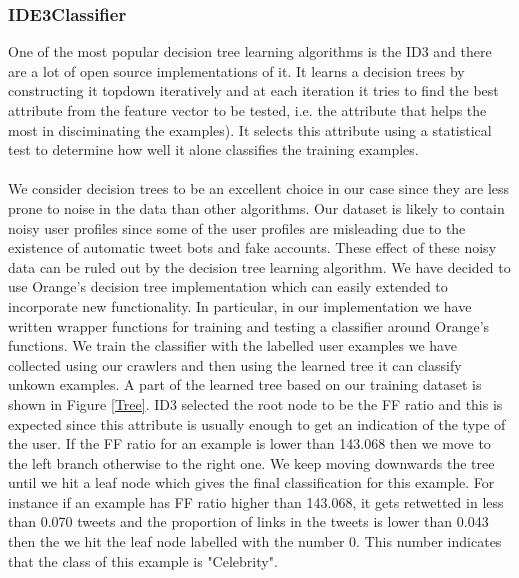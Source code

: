 \subsubsection{IDE3Classifier}
One of the most popular decision tree learning algorithms is the ID3 and there are a lot of open source implementations of it. It learns a decision trees by constructing it topdown iteratively and 
at each iteration it tries to find the best attribute from the feature vector to be tested, i.e. the attribute that helps the most in disciminating the examples). It selects this attribute using
a statistical test to determine how well it alone classifies the training examples.\\\\
We consider decision trees to be an excellent choice in our case since they are less prone to noise in the data than other algorithms. Our dataset is likely to contain noisy user profiles since some of the user profiles are misleading due to the existence of automatic tweet bots and fake accounts. These effect of these noisy data can be ruled out by the decision tree learning algorithm.  
We have decided to use Orange's decision tree implementation which can easily extended to incorporate new functionality. In particular, in our implementation we have written wrapper functions for training and testing a classifier around Orange's functions. We train the classifier with the labelled user examples we have collected using our crawlers and then using the learned tree it can classify unkown examples. A part of the learned tree based on our training dataset is shown in Figure \ref{Tree}. ID3 selected the root node to be the FF ratio and this is expected since this attribute is usually enough to get an indication of the type of the user. If the FF ratio for an example is lower than 143.068 then we move to the left branch otherwise to the right one. We keep moving downwards the tree until we hit a leaf node which gives the final classification for this example. For instance if an example has FF ratio higher than 143.068, it gets retwetted in less than 0.070 tweets and the proportion of links in the tweets is lower than 0.043 then the we hit the leaf node labelled with the number $0$. This number indicates that the class of this example is "Celebrity".

